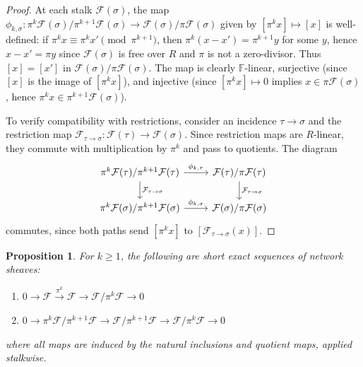 \documentclass[11pt]{amsart}
\theoremstyle{plain}
\newtheorem{proposition}[theorem]{Proposition}
\theoremstyle{definition}
\newcommand{\Ring}{R}                          %
\newcommand{\unif}{\pi}                        %
\newcommand{\sheaf}[1]{\mathcal{#1}}                  %
\newcommand{\stalk}[2]{#1(#2)}                        %
\newcommand{\face}{\to}                               %
\newcommand{\res}[3]{#1_{#2 \face #3}}                  %
\begin{document}
\begin{proof}
At each stalk $\stalk{\sheaf{F}}{\sigma}$, the map $\phi_{k,\sigma}: \unif^k\stalk{\sheaf{F}}{\sigma}/\unif^{k+1}\stalk{\sheaf{F}}{\sigma} \to \stalk{\sheaf{F}}{\sigma}/\unif\stalk{\sheaf{F}}{\sigma}$ given by $[\unif^k x] \mapsto [x]$ is well-defined: if $\unif^k x \equiv \unif^k x' \pmod{\unif^{k+1}}$, then $\unif^k(x - x') = \unif^{k+1} y$ for some $y$, hence $x - x' = \unif y$ since $\stalk{\sheaf{F}}{\sigma}$ is free over $\Ring$ and $\unif$ is not a zero-divisor. Thus $[x] = [x']$ in $\stalk{\sheaf{F}}{\sigma}/\unif\stalk{\sheaf{F}}{\sigma}$. The map is clearly $\mathbb{F}$-linear, surjective (since $[x]$ is the image of $[\unif^k x]$), and injective (since $[\unif^k x] \mapsto 0$ implies $x \in \unif\stalk{\sheaf{F}}{\sigma}$, hence $\unif^k x \in \unif^{k+1}\stalk{\sheaf{F}}{\sigma}$).

To verify compatibility with restrictions, consider an incidence $\tau \to \sigma$ and the restriction map $\res{\sheaf{F}}{\tau}{\sigma}: \stalk{\sheaf{F}}{\tau} \to \stalk{\sheaf{F}}{\sigma}$. Since restriction maps are $\Ring$-linear, they commute with multiplication by $\unif^k$ and pass to quotients. The diagram
\[
\begin{tikzcd}
\unif^k\stalk{\sheaf{F}}{\tau}/\unif^{k+1}\stalk{\sheaf{F}}{\tau} \arrow{r}{\phi_{k,\tau}} \arrow{d}{\res{\sheaf{F}}{\tau}{\sigma}} & \stalk{\sheaf{F}}{\tau}/\unif\stalk{\sheaf{F}}{\tau} \arrow{d}{\res{\sheaf{F}}{\tau}{\sigma}} \\
\unif^k\stalk{\sheaf{F}}{\sigma}/\unif^{k+1}\stalk{\sheaf{F}}{\sigma} \arrow{r}{\phi_{k,\sigma}} & \stalk{\sheaf{F}}{\sigma}/\unif\stalk{\sheaf{F}}{\sigma}
\end{tikzcd}
\]
commutes, since both paths send $[\unif^k x]$ to $[\res{\sheaf{F}}{\tau}{\sigma}(x)]$.
\end{proof}


\begin{proposition}
\label{prop:basic-ses}
For $k \geq 1$, the following are short exact sequences of network sheaves:
\begin{enumerate}[label=\textup{(\roman*)}]
\item $0 \to \sheaf{F} \xrightarrow{\unif^k} \sheaf{F} \to \sheaf{F}/\unif^k\sheaf{F} \to 0$
\item $0 \to \unif^k\sheaf{F}/\unif^{k+1}\sheaf{F} \to \sheaf{F}/\unif^{k+1}\sheaf{F} 
\to \sheaf{F}/\unif^k\sheaf{F} \to 0$
\end{enumerate}
where all maps are induced by the natural inclusions and quotient maps, applied 
stalkwise.
\end{proposition}
\end{document}
